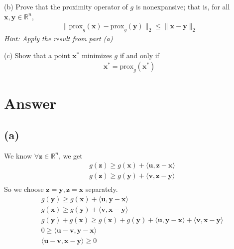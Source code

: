 \documentclass{article}
\newcommand{\R}{\mathbb{R}}
\begin{document}
\noindent
(b) Prove that the proximity operator of \(g\) is nonexpansive; that is, for all \(\bm{x}, \bm{y} \in \R^n\),
\begin{align*}
    \|\text{prox}_g (\bm{x}) - \text{prox}_g(\bm{y})\|_2 \leq \|\bm{x} - \bm{y}\|_2
\end{align*}
\textit{Hint: Apply the result from part (a)}

\noindent
(c) Show that a point \(\bm{x}^*\) minimizes \(g\) if and only if
\begin{align*}
    \bm{x}^* = \text{prox}_g(\bm{x}^*)
\end{align*}

\section*{Answer}
\subsection*{(a)}
We know \(\forall \bm{z} \in \R^n\), we get
\begin{align*}
    &g(\bm{z}) \geq g(\bm{x}) + \langle \bm{u}, \bm{z} - \bm{x}\rangle \\
    &g(\bm{z}) \geq g(\bm{y}) + \langle \bm{v}, \bm{z} - \bm{y}\rangle \\
\end{align*}
So we choose \(\bm{z} = \bm{y}, \bm{z} = \bm{x}\) separately.
\begin{align*}
    &g(\bm{y}) \geq g(\bm{x}) + \langle \bm{u}, \bm{y} - \bm{x}\rangle \\
    &g(\bm{x}) \geq g(\bm{y}) + \langle \bm{v}, \bm{x} - \bm{y}\rangle \\
    &g(\bm{y}) + g(\bm{x}) \geq g(\bm{x}) + g(\bm{y}) + \langle \bm{u}, \bm{y} - \bm{x}\rangle + \langle \bm{v}, \bm{x} - \bm{y}\rangle \\
    &0 \geq \langle \bm{u} - \bm{v}, \bm{y} - \bm{x}\rangle \\
    &\langle \bm{u} - \bm{v}, \bm{x} - \bm{y}\rangle \geq 0
\end{align*}
\end{document}
